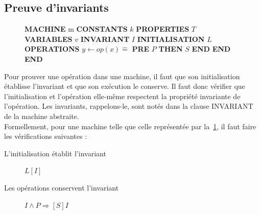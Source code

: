 \documentclass[10pt,a4paper]{article}
\newcommand{\Bequal}{\mathrel{\widehat{=}}}
\begin{document}
\setlength\LTleft{\fill}
\subsection{Preuve d'invariants}
\label{Preuve}


\setlength{\intextsep}{0pt}%
\setlength{\columnsep}{15pt}%
\begin{figure}
\noindent \textbf{MACHINE} m \newline
\textbf{CONSTANTS} $k$ \newline
\textbf{PROPERTIES} $T$ \newline
\textbf{VARIABLES} $v$ \newline
\textbf{INVARIANT} $I$ \newline
\textbf{INITIALISATION} $L$ \newline
\textbf{OPERATIONS} \newline
$y \leftarrow op(x) \Bequal$ \newline
\hspace*{1em}  \textbf{PRE} $P$ \textbf{THEN} $S$ \newline
\hspace*{2em} \textbf{END} \newline
\hspace*{1em} \textbf{END} \newline
\textbf{END}
\label{M1}
\end{figure}

Pour prouver une opération dans une machine, il faut que son initialisation établisse l'invariant et que son exécution le conserve. Il faut donc vérifier que l'initialisation et l'opération elle-même respectent la propriété invariante de l'opération. Les invariants, rappelons-le, sont notés dans la clause INVARIANT de la machine abstraite. \\

Formellement, pour une machine telle que celle représentée par la~\cref{M1}, il faut faire les vérifications suivantes :
\begin{description}
\item[L'initialisation établit l'invariant] $L[I]$ 
\item[Les opérations conservent l'invariant] $I \wedge P \Rightarrow [S]I$ 
\end{description}
\end{document}
